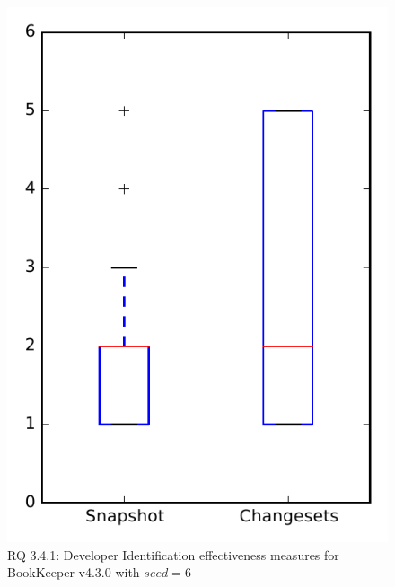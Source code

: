 
\begin{figure}
\centering
\includegraphics[height=0.4\textheight]{figures/dit_seed/rq1_bookkeeper_6}
\caption{RQ 3.4.1: Developer Identification effectiveness measures for BookKeeper v4.3.0 with $seed=6$}
\label{fig:dit_seed:rq1:bookkeeper}
\end{figure}
